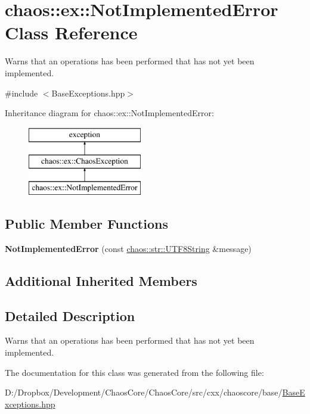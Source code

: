 \hypertarget{classchaos_1_1ex_1_1_not_implemented_error}{}\section{chaos\+:\+:ex\+:\+:Not\+Implemented\+Error Class Reference}
\label{classchaos_1_1ex_1_1_not_implemented_error}


Warns that an operations has been performed that has not yet been implemented.  




{\ttfamily \#include $<$Base\+Exceptions.\+hpp$>$}

Inheritance diagram for chaos\+:\+:ex\+:\+:Not\+Implemented\+Error\+:\begin{figure}[H]
\begin{center}
\leavevmode
\includegraphics[height=3.000000cm]{classchaos_1_1ex_1_1_not_implemented_error}
\end{center}
\end{figure}
\subsection*{Public Member Functions}
\begin{DoxyCompactItemize}
\item 
\hypertarget{classchaos_1_1ex_1_1_not_implemented_error_ae265436ed431e4e7ab94b7ebd6e393a7}{}{\bfseries Not\+Implemented\+Error} (const \hyperlink{classchaos_1_1str_1_1_u_t_f8_string}{chaos\+::str\+::\+U\+T\+F8\+String} \&message)\label{classchaos_1_1ex_1_1_not_implemented_error_ae265436ed431e4e7ab94b7ebd6e393a7}

\end{DoxyCompactItemize}
\subsection*{Additional Inherited Members}


\subsection{Detailed Description}
Warns that an operations has been performed that has not yet been implemented. 

The documentation for this class was generated from the following file\+:\begin{DoxyCompactItemize}
\item 
D\+:/\+Dropbox/\+Development/\+Chaos\+Core/\+Chaos\+Core/src/cxx/chaoscore/base/\hyperlink{_base_exceptions_8hpp}{Base\+Exceptions.\+hpp}\end{DoxyCompactItemize}
